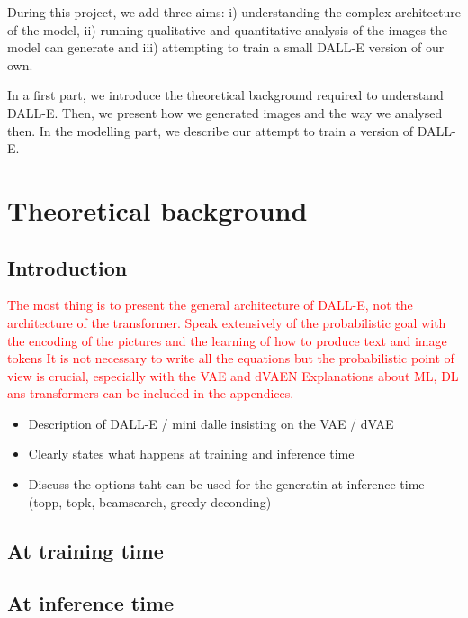 \documentclass{article}
\begin{document}
During this project, we add three aims: i) understanding the complex architecture of the model, ii) running qualitative and quantitative analysis of the images the model can generate and iii) attempting to train a small DALL-E version of our own.

In a first part, we introduce the theoretical background required to understand DALL-E. Then, we present how we generated images and the way we analysed then. In the modelling part, we describe our attempt to train a version of DALL-E.

\pagebreak
\section{Theoretical background}

\subsection{Introduction}
\textcolor{red}{
The most thing is to present the general architecture of DALL-E, not the architecture of the transformer. Speak extensively of the probabilistic goal with the encoding of the pictures and the learning of how to produce text and image tokens 
It is not necessary to write all the equations but the probabilistic point of view is crucial, especially with the VAE and dVAEN
Explanations about ML, DL ans transformers can be included in the appendices.
}


\begin{itemize}
    \item Description of DALL-E / mini dalle insisting on the VAE / dVAE 
    \item Clearly states what happens at training and inference time
    \item Discuss the options taht can be used for the generatin at inference time (topp, topk, beamsearch, greedy deconding)
\end{itemize}

\subsection{At training time}

\subsection{At inference time}
\end{document}
